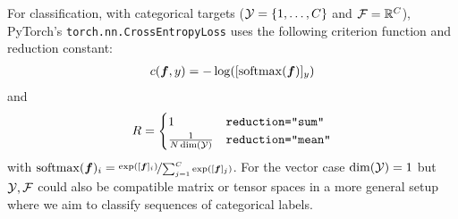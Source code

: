 \begin{example}\label{ex:cross_entropy_loss}
  For classification, with categorical targets (${\mathcal{Y}} = \{1, \dots, C\}$ and ${\mathcal{F}} = {\mathbb{R}}^C$), PyTorch's \texttt{torch.nn.CrossEntropyLoss} uses the following criterion function and reduction constant:
  \begin{align*}
    c({\bm{f}}, y)
    =
    - \log([\mathrm{softmax}({\bm{f}})]_y)
  \end{align*}
  and
  \begin{align*}
    R
    =
    \begin{cases}
      1                     & \text{\texttt{reduction="sum"}}
      \\
      \frac{1}{N \dim({\mathcal{Y}})} & \text{\texttt{reduction="mean"}}
    \end{cases}
  \end{align*}
  with $\mathrm{softmax}({\bm{f}})_i = \nicefrac{\exp([{\bm{f}}]_i)}{\sum_{j=1}^C \exp([{\bm{f}}]_{j})}$.
  For the vector case $\dim({\mathcal{Y}}) = 1$ but ${\mathcal{Y}}, {\mathcal{F}}$ could also be compatible matrix or tensor spaces in a more general setup where we aim to classify sequences of categorical labels.
\end{example}
